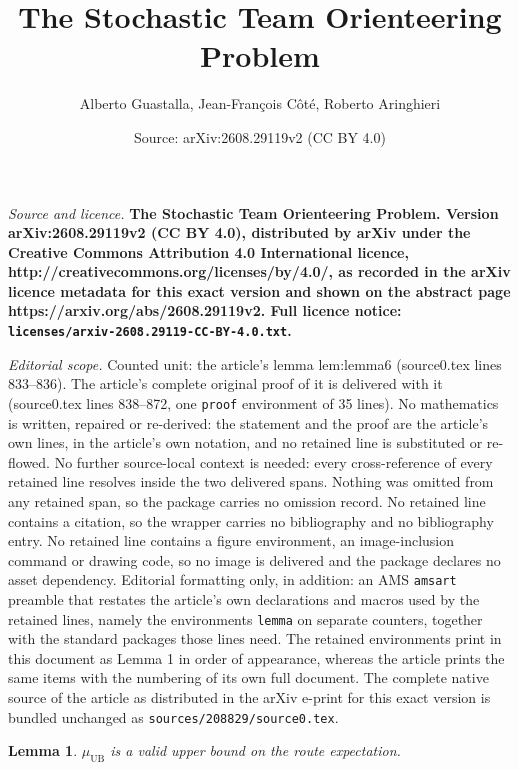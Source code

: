 \documentclass[10pt,a4paper]{amsart}
\title{\Large\bf The Stochastic Team Orienteering Problem}
\author{Alberto Guastalla, Jean-François Côté, Roberto Aringhieri}
\date{Source: arXiv:2608.29119v2 (CC BY 4.0)}
\newtheorem{lemma}{Lemma}
\begin{document}
\maketitle

\noindent\emph{Source and licence.} \Large\bf The Stochastic Team Orienteering Problem. Version arXiv:2608.29119v2 (CC BY 4.0), distributed by arXiv under the Creative Commons Attribution 4.0 International licence, http://creativecommons.org/licenses/by/4.0/, as recorded in the arXiv licence metadata for this exact version and shown on the abstract page https://arxiv.org/abs/2608.29119v2. Full licence notice: \texttt{licenses/arxiv-2608.29119-CC-BY-4.0.txt}.\par\smallskip

\noindent\textit{Editorial scope.} Counted unit: the article's lemma lem:lemma6 (source0.tex lines 833--836). The article's complete original proof of it is delivered with it (source0.tex lines 838--872, one \texttt{proof} environment of 35 lines). No mathematics is written, repaired or re-derived: the statement and the proof are the article's own lines, in the article's own notation, and no retained line is substituted or re-flowed.  No further source-local context is needed: every cross-reference of every retained line resolves inside the two delivered spans.  Nothing was omitted from any retained span, so the package carries no omission record.  No retained line contains a citation, so the wrapper carries no bibliography and no bibliography entry.  No retained line contains a figure environment, an image-inclusion command or drawing code, so no image is delivered and the package declares no asset dependency.  Editorial formatting only, in addition: an AMS \texttt{amsart} preamble that restates the article's own declarations and macros used by the retained lines, namely the environments \texttt{lemma} on separate counters, together with the standard packages those lines need.  The retained environments print in this document as Lemma 1 in order of appearance, whereas the article prints the same items with the numbering of its own full document.  The complete native source of the article as distributed in the arXiv e-print for this exact version is bundled unchanged as \texttt{sources/208829/source0.tex}.
\begin{lemma}
\label{lem:lemma6}
$\mu_{\text{UB}}$ is a valid upper bound on the route expectation.
\end{lemma}
\end{document}
